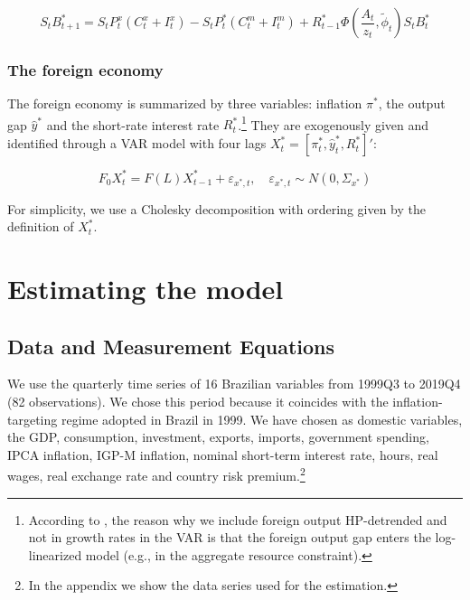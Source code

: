 \documentclass[12pt,oneside,a4paper]{article}
\begin{document}
\begin{equation}
    S_tB_{t+1}^{*} = S_tP_t^{x}(C_t^{x} + I_t^{x}) - S_tP_t^{*}(C_t^{m} + I_t^{m})
    + R_{t-1}^{*}\Phi \left(\frac{A_t}{z_t},\tilde{\phi}_t \right)S_tB_{t}^{*}
\end{equation}
\subsubsection{The foreign economy}
The foreign economy is summarized by three variables: inflation $\pi^{*}$, the output gap $\hat{y}^{*}$ and the short-rate interest rate $R_t^{*}$.\footnote{According to \citet{Adolfson:2011}, the reason why we include foreign output HP-detrended and not in growth rates in the VAR is that the foreign output gap enters the log-linearized model (e.g., in the aggregate resource constraint).} They are exogenously given and identified through a VAR model with four lags $X_{t}^{*} = \left[\pi_t^{*}, \hat{y}_t^{*}, R_t^{*} \right]'$:

\begin{equation}
F_{0} X_{t}^{*}=F(L) X_{t-1}^{*}+\varepsilon_{x^{*}, t}, \quad \varepsilon_{x^{*}, t} \sim N\left(0, \Sigma_{x^{*}}\right)
\end{equation}

For simplicity, we use a Cholesky decomposition with ordering given by the definition of $X_{t}^{*}$.
\section{Estimating the model}
\subsection{Data and Measurement Equations}
We use the quarterly time series of 16 Brazilian variables from 1999Q3 to 2019Q4 (82 observations). We chose this period because it coincides with the inflation-targeting regime adopted in Brazil in 1999. We have chosen as domestic variables, the GDP, consumption, investment, exports, imports, government spending, IPCA inflation, IGP-M inflation, nominal short-term interest rate,  hours, real wages, real exchange rate and country risk premium.\footnote{In the appendix we show the data series used for the estimation.} 
\end{document}
